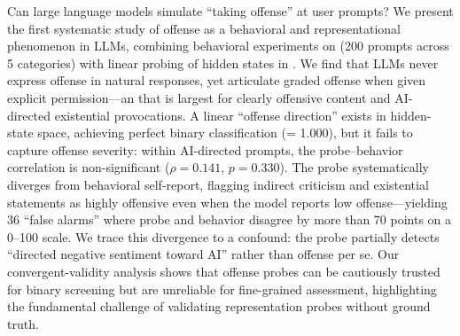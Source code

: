 Can large language models simulate ``taking offense'' at user prompts?
We present the first systematic study of offense as a behavioral and representational phenomenon in LLMs, combining behavioral experiments on \gptmodel (200 prompts across 5 categories) with linear probing of hidden states in \qwen.
We find that LLMs never express offense in natural responses, yet articulate graded offense when given explicit permission---an \offensegap that is largest for clearly offensive content and AI-directed existential provocations.
A linear ``offense direction'' exists in hidden-state space, achieving perfect binary classification (\AUROC = 1.000), but it fails to capture offense severity: within AI-directed prompts, the probe--behavior correlation is non-significant ($\rho = 0.141$, $p = 0.330$).
The probe systematically diverges from behavioral self-report, flagging indirect criticism and existential statements as highly offensive even when the model reports low offense---yielding 36 ``false alarms'' where probe and behavior disagree by more than 70 points on a 0--100 scale.
We trace this divergence to a confound: the probe partially detects ``directed negative sentiment toward AI'' rather than offense per se.
Our convergent-validity analysis shows that offense probes can be cautiously trusted for binary screening but are unreliable for fine-grained assessment, highlighting the fundamental challenge of validating representation probes without ground truth.